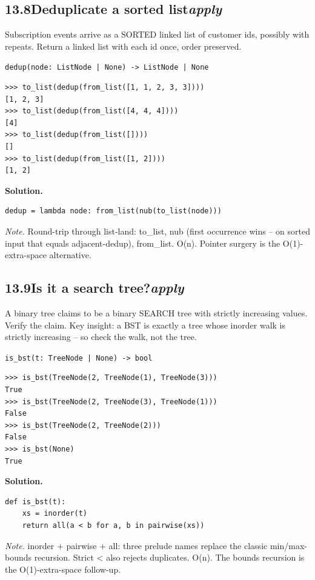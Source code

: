 \documentclass[10pt,letterpaper]{book}
\begin{document}
\subsection*{13.8\quad Deduplicate a sorted list\hfill\textnormal{\textit{apply}}}
Subscription events arrive as a SORTED linked list of customer ids, possibly with repeats. Return a linked list with each id once, order preserved.

\noindent\texttt{dedup(node: ListNode | None) -> ListNode | None}
\begin{lstlisting}[style=ex]
>>> to_list(dedup(from_list([1, 1, 2, 3, 3])))
[1, 2, 3]
>>> to_list(dedup(from_list([4, 4, 4])))
[4]
>>> to_list(dedup(from_list([])))
[]
>>> to_list(dedup(from_list([1, 2])))
[1, 2]
\end{lstlisting}
\noindent\textbf{Solution.}
\begin{lstlisting}[style=code]
dedup = lambda node: from_list(nub(to_list(node)))
\end{lstlisting}
\noindent\textit{Note.} Round-trip through list-land: to\_list, nub (first occurrence wins -- on sorted input that equals adjacent-dedup), from\_list. O(n). Pointer surgery is the O(1)-extra-space alternative.

\subsection*{13.9\quad Is it a search tree?\hfill\textnormal{\textit{apply}}}
A binary tree claims to be a binary SEARCH tree with strictly increasing values. Verify the claim. Key insight: a BST is exactly a tree whose inorder walk is strictly increasing -- so check the walk, not the tree.

\noindent\texttt{is\_bst(t: TreeNode | None) -> bool}
\begin{lstlisting}[style=ex]
>>> is_bst(TreeNode(2, TreeNode(1), TreeNode(3)))
True
>>> is_bst(TreeNode(2, TreeNode(3), TreeNode(1)))
False
>>> is_bst(TreeNode(2, TreeNode(2)))
False
>>> is_bst(None)
True
\end{lstlisting}
\noindent\textbf{Solution.}
\begin{lstlisting}[style=code]
def is_bst(t):
    xs = inorder(t)
    return all(a < b for a, b in pairwise(xs))
\end{lstlisting}
\noindent\textit{Note.} inorder + pairwise + all: three prelude names replace the classic min/max-bounds recursion. Strict < also rejects duplicates. O(n). The bounds recursion is the O(1)-extra-space follow-up.
\end{document}
